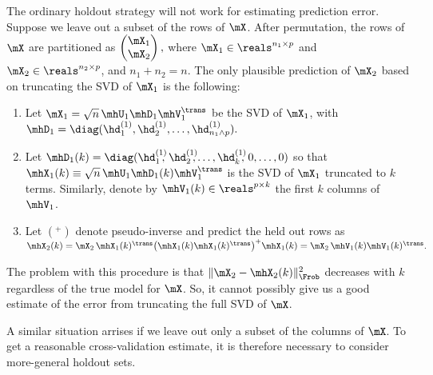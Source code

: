The ordinary holdout strategy will not work for estimating prediction error.  Suppose we leave out a subset of the rows of $\mX$.  After
permutation, the rows of $\mX$ are partitioned as
\(
    \left(
    \begin{matrix}
        \mX_1 \\
        \mX_2
    \end{matrix}
    \right),
\)
where $\mX_1 \in \reals^{n_1 \times p}$ and $\mX_2 \in \reals^{n_2 \times p}$,
and $n_1 + n_2 = n$.  The only plausible prediction of $\mX_2$ based on truncating the SVD of $\mX_1$ is the following:
\begin{enumerate}
    \item Let $\mX_1 = \sqrt{n} \, \mhU_1 \mhD_1 \mhV_1^\trans$ be the SVD of
        $\mX_1$, with 
        \(
            \mhD_1 
                = 
                \diag( 
                    \hd_1^{(1)}, 
                    \hd_2^{(1)}, 
                    \ldots, 
                    \hd_{n_1 \wedge p}^{(1)}
                ).
        \)
    \item Let 
        \(
            \mhD_1(k)
                =
                \diag(
                    \hd_1^{(1)}\!\!\!, \,
                    \hd_2^{(1)}\!\!\!, 
                    \ldots, 
                    \hd_k^{(1)}\!\!\!, \,
                    0,
                    \ldots,
                    0
                )
        \)
        so that
        $\mhX_1(k) \equiv \sqrt{n} \, \mhU_1 \mhD_1(k) \mhV_1^\trans$ is
        the SVD of $\mX_1$ truncated to $k$ terms.  Similarly, denote
        by $\mhV_1(k) \in \reals^{p \times k}$ the first $k$ columns of
        $\mhV_1$.
    \item Let $(^+)$ denote pseudo-inverse and predict the held out rows as
        \(
            \mhX_2(k) 
                = 
                    \mX_2 \,
                    \mhX_1(k)^\trans
                    \big(
                        \mhX_1(k) \mhX_1(k)^\trans
                    \big)^{+}
                    \mhX_1(k)
                =
                    \mX_2 \, \mhV_1(k) \mhV_1(k)^\trans.
        \)
\end{enumerate}
The problem with this procedure is that $\| \mX_2 - \mhX_2(k) \|_\Frob^2$ 
decreases with $k$ regardless of the true model for $\mX$.  So, it cannot
possibly give us a good estimate of the error from truncating the full
SVD of $\mX$.

A similar situation arrises if we leave out only a subset of the columns of
$\mX$.  To get a reasonable cross-validation estimate, it is therefore 
necessary to consider more-general holdout sets.


